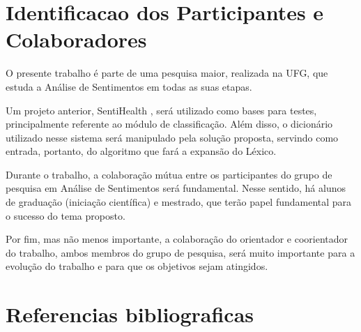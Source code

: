 \documentclass[a4paper,11pt]{article}
\begin{document}
\section{Identificacao dos Participantes e Colaboradores}
O presente trabalho é parte de uma pesquisa maior, realizada na UFG, que estuda a Análise de Sentimentos em todas as suas etapas.

Um projeto anterior, SentiHealth \cite{Rodrigues2016}, será utilizado como bases para testes, principalmente referente ao módulo de classificação. Além disso, o dicionário utilizado nesse sistema será manipulado pela solução proposta, servindo como entrada, portanto, do algoritmo que fará a expansão do Léxico.

Durante o trabalho, a colaboração mútua entre os participantes do grupo de pesquisa em Análise de Sentimentos será fundamental. Nesse sentido, há alunos de graduação (iniciação científica) e mestrado, que terão papel fundamental para o sucesso do tema proposto.

Por fim, mas não menos importante, a colaboração do orientador e coorientador do trabalho, ambos membros do grupo de pesquisa, será muito importante para a evolução do trabalho e para que os objetivos sejam atingidos.
\section{Referencias bibliograficas}


\end{document}
